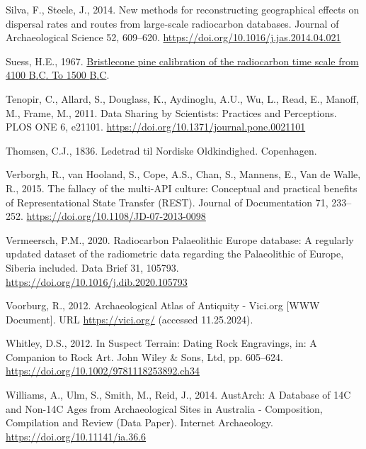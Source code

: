 \documentclass[
  number,
  doubleblind]{elsarticle}
\newlength{\cslhangindent}
\newenvironment{CSLReferences}[2] %
 {\begin{list}{}{%
  \setlength{\itemindent}{0pt}
  \setlength{\leftmargin}{0pt}
  \setlength{\parsep}{0pt}
  \ifodd #1
   \setlength{\leftmargin}{\cslhangindent}
   \setlength{\itemindent}{-1\cslhangindent}
  \fi
  \setlength{\itemsep}{#2\baselineskip}}}
 {\end{list}}
\begin{document}
\begin{CSLReferences}{1}{0}
Silva, F., Steele, J., 2014. New methods for reconstructing geographical
effects on dispersal rates and routes from large-scale radiocarbon
databases. Journal of Archaeological Science 52, 609--620.
\url{https://doi.org/10.1016/j.jas.2014.04.021}

Suess, H.E., 1967.
\href{https://www.osti.gov/etdeweb/biblio/20895312}{Bristlecone pine
calibration of the radiocarbon time scale from 4100 {B}.{C}. To 1500
{B}.{C}}.

Tenopir, C., Allard, S., Douglass, K., Aydinoglu, A.U., Wu, L., Read,
E., Manoff, M., Frame, M., 2011. Data {Sharing} by {Scientists}:
{Practices} and {Perceptions}. PLOS ONE 6, e21101.
\url{https://doi.org/10.1371/journal.pone.0021101}

Thomsen, C.J., 1836. Ledetrad til {Nordiske Oldkindighed}. Copenhagen.

Verborgh, R., van Hooland, S., Cope, A.S., Chan, S., Mannens, E., Van de
Walle, R., 2015. The fallacy of the multi-{API} culture: {Conceptual}
and practical benefits of {Representational State Transfer} ({REST}).
Journal of Documentation 71, 233--252.
\url{https://doi.org/10.1108/JD-07-2013-0098}

Vermeersch, P.M., 2020. Radiocarbon {Palaeolithic Europe} database: {A}
regularly updated dataset of the radiometric data regarding the
{Palaeolithic} of {Europe}, {Siberia} included. Data Brief 31, 105793.
\url{https://doi.org/10.1016/j.dib.2020.105793}

Voorburg, R., 2012. Archaeological {Atlas} of {Antiquity} - {Vici}.org
{[}WWW Document{]}. URL \url{https://vici.org/} (accessed 11.25.2024).

Whitley, D.S., 2012. In {Suspect Terrain}: {Dating Rock Engravings}, in:
A {Companion} to {Rock Art}. John Wiley \& Sons, Ltd, pp. 605--624.
\url{https://doi.org/10.1002/9781118253892.ch34}

Williams, A., Ulm, S., Smith, M., Reid, J., 2014. {AustArch}: {A
Database} of {14C} and {Non-14C Ages} from {Archaeological Sites} in
{Australia} - {Composition}, {Compilation} and {Review} ({Data Paper}).
Internet Archaeology. \url{https://doi.org/10.11141/ia.36.6}


\end{CSLReferences}
\end{document}
